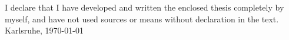 I declare that I have developed and written the enclosed thesis completely by myself, and have not used sources or means without declaration in the text.
\\[10ex]

\underline{\hspace{6cm}} \newline
Karlsruhe,  \today \\[4ex]


